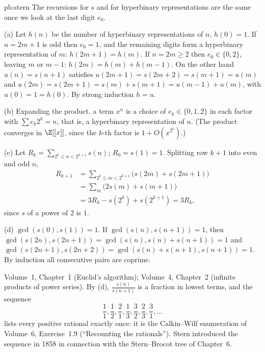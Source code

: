 \begin{solution}{pb:stern}
\idea The recursions for $s$ and for hyperbinary representations are the same once we look at the last digit $e_0$.

\writeup (a) Let $h(n)$ be the number of hyperbinary representations of $n$, $h(0)=1$. If $n=2m+1$ is odd then $e_0=1$, and the
remaining digits form a hyperbinary representation of $m$: $h(2m+1)=h(m)$. If $n=2m\ge2$ then $e_0\in\{0,2\}$, leaving $m$ or $m-1$:
$h(2m)=h(m)+h(m-1)$. On the other hand $u(n)=s(n+1)$ satisfies $u(2m+1)=s(2m+2)=s(m+1)=u(m)$ and
$u(2m)=s(2m+1)=s(m)+s(m+1)=u(m-1)+u(m)$, with $u(0)=1=h(0)$. By strong induction $h=u$.

(b) Expanding the product, a term $x^n$ is a choice of $e_k\in\{0,1,2\}$ in each factor with $\sum e_k2^k=n$, that is, a
hyperbinary representation of $n$. (The product converges in $\Z[[x]]$, since the $k$-th factor is $1+O(x^{2^k})$.)

(c) Let $R_k=\sum_{2^k\le n<2^{k+1}}s(n)$; $R_0=s(1)=1$. Splitting row $k+1$ into even and odd $n$,
\[
\begin{aligned}
R_{k+1}&=\sum_{2^k\le m<2^{k+1}}\bigl(s(2m)+s(2m+1)\bigr)\\
&=\sum_m\bigl(2s(m)+s(m+1)\bigr)\\
&=3R_k-s(2^k)+s(2^{k+1})=3R_k,
\end{aligned}
\]
since $s$ of a power of $2$ is $1$.

(d) $\gcd(s(0),s(1))=1$. If $\gcd(s(n),s(n+1))=1$, then $\gcd(s(2n),s(2n+1))=\gcd(s(n),s(n)+s(n+1))=1$ and
$\gcd(s(2n+1),s(2n+2))=\gcd(s(n)+s(n+1),s(n+1))=1$. By induction all consecutive pairs are coprime.

\tools Volume~1, Chapter~1 (Euclid's algorithm); Volume~4, Chapter~2 (infinite products of power series).
\leads By (d), $\frac{s(n)}{s(n+1)}$ is a fraction in lowest terms, and the sequence
\[
\frac11,\frac12,\frac21,\frac13,\frac32,\frac23,\frac31,\dots
\]
lists every positive rational exactly once: it is the Calkin--Wilf enumeration of Volume~6, Exercise~1.9 (``Recounting the
rationals''). Stern introduced the sequence in 1858 in connection with the Stern--Brocot tree of Chapter~6.
\end{solution}

